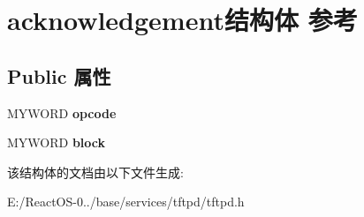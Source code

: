 \hypertarget{structacknowledgement}{}\section{acknowledgement结构体 参考}
\label{structacknowledgement}
\subsection*{Public 属性}
\begin{DoxyCompactItemize}
\item 
\mbox{\label{structacknowledgement_a57fe8ee643818d724e320f2f9c23a6d5}} 
M\+Y\+W\+O\+RD {\bfseries opcode}
\item 
\mbox{\label{structacknowledgement_aab5c848c49e413aee5fb798712cdb110}} 
M\+Y\+W\+O\+RD {\bfseries block}
\end{DoxyCompactItemize}


该结构体的文档由以下文件生成\+:\begin{DoxyCompactItemize}
\item 
E\+:/\+React\+O\+S-\/0../base/services/tftpd/tftpd.\+h\end{DoxyCompactItemize}
